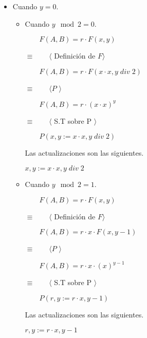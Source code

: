 \documentclass[hidelinks]{article}
\begin{document}
\begin{enumerate}
\begin{itemize}
		      \item Cuando $y = 0$.\par

		            \begin{itemize}
			            \item Cuando $y \mod 2 = 0$.\par
			                  $\qquad F(A,B) = r \cdot F(x,y)$\par
			                  $\equiv \qquad \langle $ Definición de $ F \rangle$\par
			                  $\qquad F(A,B) = r \cdot F(x \cdot x, y \; div \; 2)$\par
			                  $\equiv \qquad \langle P$  $\rangle$\par
			                  $\qquad F(A,B) = r \cdot (x \cdot x)^y$\par
			                  $\equiv \qquad \langle $ S.T sobre P $\rangle$\par
			                  $\qquad P(x,y := x \cdot x, y \; div \; 2)$\par
			                  Las actualizaciones son las siguientes.\par

			                  \begin{center}
				                  $x,y := x \cdot x, y \; div \; 2$\par
			                  \end{center}
			            \item Cuando $y \mod 2 = 1$.\par
			                  $\qquad F(A,B) = r \cdot F(x,y)$\par
			                  $\equiv \qquad \langle $ Definición de $ F \rangle$\par
			                  $\qquad F(A,B) = r \cdot x \cdot F(x, y - 1)$\par
			                  $\equiv \qquad \langle P$  $\rangle$\par
			                  $\qquad F(A,B) = r \cdot x \cdot (x)^{y-1}$\par
			                  $\equiv \qquad \langle $ S.T sobre P $\rangle$\par
			                  $\qquad P(r,y := r \cdot x, y - 1)$\par
			                  Las actualizaciones son las siguientes.\par

			                  \begin{center}
				                  $r,y := r \cdot x, y - 1$\par
			                  \end{center}
		            \end{itemize}
	      \end{itemize}


\end{enumerate}
\end{document}
